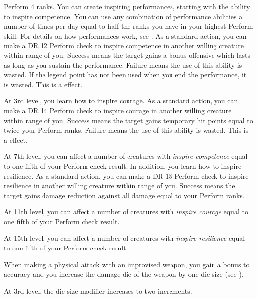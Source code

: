     \featpre Perform 4 ranks.
    \featben You can create inspiring performances, starting with the ability to inspire competence.
    You can use any combination of performance abilities a number of times per day equal to half the ranks you have in your highest Perform skill.
    For details on how performances work, see .
    As a standard action, you can make a DR 12 Perform check to inspire competence in another willing creature within \rngmed range of you.
    Success means the target gains a bonus offensive  which lasts as long as you sustain the performance.
    Failure means the use of this ability is wasted.
    If the legend point has not been used when you end the performance, it is wasted.
    This is a  effect.

    At 3rd level, you learn how to inspire courage.
     As a standard action, you can make a DR 14 Perform check to inspire courage in another willing creature within \rngmed range of you.
    Success means the target gains temporary hit points equal to twice your Perform ranks.
    Failure means the use of this ability is wasted.
    This is a  effect.

    At 7th level, you can affect a number of creatures with \textit{inspire competence} equal to one fifth of your Perform check result.
    In addition, you learn how to inspire resilience.
     As a standard action, you can make a DR 18 Perform check to inspire resilience in another willing creature within \rngmed range of you.
    Success means the target gains damage reduction against all damage equal to your Perform ranks.

    At 11th level, you can affect a number of creatures with \textit{inspire courage} equal to one fifth of your Perform check result.

    At 15th level, you can affect a number of creatures with \textit{inspire resilience} equal to one fifth of your Perform check result.

    \featben When making a physical attack with an improvised weapon, you gain a  bonus to accuracy and you increase the damage die of the weapon by one die size (see ).

    At 3rd level, the die size modifier increases to two increments.

